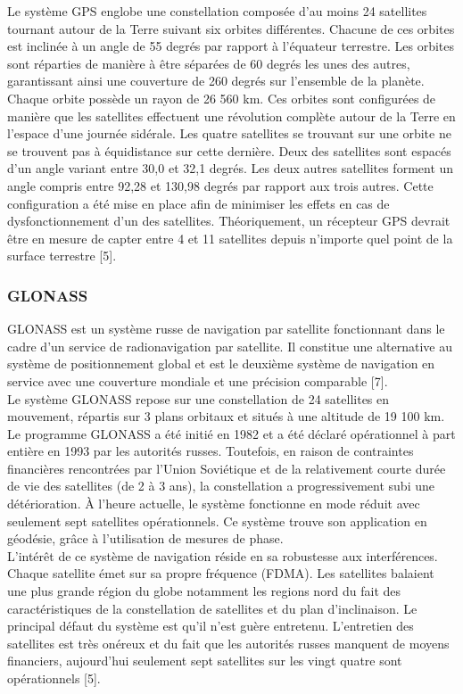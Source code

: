 Le système GPS englobe une constellation composée d'au moins 24 satellites tournant autour de la Terre suivant six orbites différentes. Chacune de ces orbites est inclinée à un angle de 55 degrés par rapport à l'équateur terrestre. Les orbites sont réparties de manière à être séparées de 60 degrés les unes des autres, garantissant ainsi une couverture de 260 degrés sur l'ensemble de la planète. Chaque orbite possède un rayon de 26 560 km. Ces orbites sont configurées de manière que les satellites effectuent une révolution complète autour de la Terre en l'espace d'une journée sidérale. Les quatre satellites se trouvant sur une orbite ne se trouvent pas à équidistance sur cette dernière. Deux des satellites sont espacés d'un angle variant entre 30,0 et 32,1 degrés. Les deux autres satellites forment un angle compris entre 92,28 et 130,98 degrés par rapport aux trois autres. Cette configuration a été mise en place afin de minimiser les effets en cas de dysfonctionnement d'un des satellites. Théoriquement, un récepteur GPS devrait être en mesure de capter entre 4 et 11 satellites depuis n'importe quel point de la surface terrestre [5].

\subsubsection{GLONASS }
GLONASS est un système russe de navigation par satellite fonctionnant dans le cadre d'un service de radionavigation par satellite. Il constitue une alternative au système de positionnement global et est le deuxième système de navigation en service avec une couverture mondiale et une précision comparable [7].\\

Le système GLONASS repose sur une constellation de 24 satellites en mouvement, répartis sur 3 plans orbitaux et situés à une altitude de 19 100 km. Le programme GLONASS a été initié en 1982 et a été déclaré opérationnel à part entière en 1993 par les autorités russes. Toutefois, en raison de contraintes financières rencontrées par l'Union Soviétique et de la relativement courte durée de vie des satellites (de 2 à 3 ans), la constellation a progressivement subi une détérioration. À l'heure actuelle, le système fonctionne en mode réduit avec seulement sept satellites opérationnels. Ce système trouve son application en géodésie, grâce à l'utilisation de mesures de phase.\\

L’intérêt de ce système de navigation réside en sa robustesse aux interférences. Chaque satellite émet sur sa propre fréquence (FDMA). Les satellites balaient une plus grande région du globe notamment les regions nord du fait des caractéristiques de la constellation de satellites et du plan d’inclinaison. Le principal défaut du système est qu’il n’est guère entretenu. L’entretien des satellites est très onéreux et du fait que les autorités russes manquent de moyens financiers, aujourd’hui seulement sept satellites sur les vingt quatre sont opérationnels [5].


